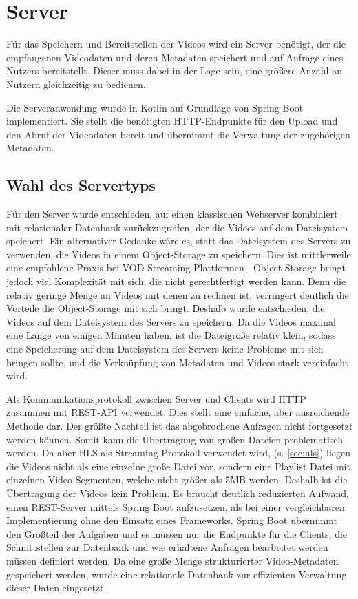 \chapter{Server} \label{sec:server}

Für das Speichern und Bereitstellen der Videos wird ein Server benötigt, der die empfangenen Videodaten und deren Metadaten speichert und auf Anfrage eines Nutzers bereitstellt. Dieser muss dabei in der Lage sein, eine größere Anzahl an Nutzern gleichzeitig zu bedienen.

Die Serveranwendung wurde in Kotlin auf Grundlage von Spring Boot implementiert. Sie stellt die benötigten HTTP-Endpunkte für den Upload und den Abruf der Videodaten bereit und übernimmt die Verwaltung der zugehörigen Metadaten.

\section{Wahl des Servertyps}

Für den Server wurde entschieden, auf einen klassischen Webserver kombiniert mit relationaler Datenbank zurückzugreifen, der die Videos auf dem Dateisystem speichert. Ein alternativer Gedanke wäre es, statt das Dateisystem des Servers zu verwenden, die Videos in einem Object-Storage zu speichern. 
Dies ist mittlerweile eine empfohlene Praxis bei \ac{VOD} Streaming Plattformen \cite{2021}. Object-Storage bringt jedoch viel Komplexität mit sich, die nicht gerechtfertigt werden kann. Denn die relativ geringe Menge an Videos mit denen zu rechnen ist, 
verringert deutlich die Vorteile die Object-Storage mit sich bringt. Deshalb wurde entschieden, die Videos auf dem Dateisystem des Servers zu speichern. Da die Videos maximal eine Länge von einigen Minuten haben, ist die Dateigröße relativ klein, 
sodass eine Speicherung auf dem Dateisystem des Servers keine Probleme mit sich bringen sollte, und die Verknüpfung von Metadaten und Videos stark vereinfacht wird.

Als Kommunikationsprotokoll zwischen Server und Clients wird HTTP zusammen mit REST-API verwendet. Dies stellt eine einfache, aber ausreichende Methode dar. Der größte Nachteil ist das abgebrochene Anfragen nicht fortgesetzt werden können. Somit kann die Übertragung von großen Dateien problematisch werden.
Da aber HLS als Streaming Protokoll verwendet wird, (s. \ref{sec:hls}) liegen die Videos nicht als eine einzelne große Datei vor, sondern eine Playlist Datei mit einzelnen Video Segmenten, welche nicht größer als 5MB werden. Deshalb ist die Übertragung der Videos kein Problem.
Es braucht deutlich reduzierten Aufwand, einen REST-Server mittels Spring Boot aufzusetzen, als bei einer vergleichbaren Implementierung ohne den Einsatz eines Frameworks. Spring Boot übernimmt den Großteil der Aufgaben und es müssen nur die Endpunkte für die Clients, 
die Schnittstellen zur Datenbank und wie erhaltene Anfragen bearbeitet werden müssen definiert werden. Da eine große Menge strukturierter Video-Metadaten gespeichert werden, wurde eine relationale Datenbank zur effizienten Verwaltung dieser Daten eingesetzt.

